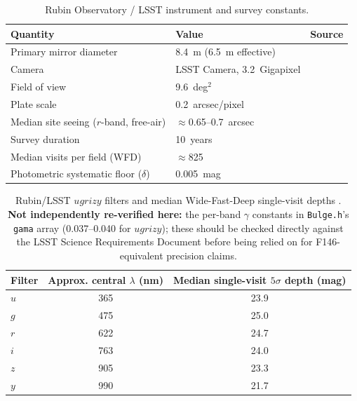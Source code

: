 \documentclass[english,10pt,a4paper]{article}
\begin{document}
	\begin{table}[htbp]
		\centering
		\begin{tabular}{lll}
			\toprule
			Quantity & Value & Source \\
			\midrule
			Primary mirror diameter & 8.4~m (6.5~m effective) & \cite{RubinAbout} \\
			Camera & LSST Camera, 3.2~Gigapixel & \cite{RubinAbout} \\
			Field of view & 9.6~deg$^2$ & \cite{Ivezic2019LSST} \\
			Plate scale & 0.2~arcsec/pixel & \cite{Ivezic2019LSST} \\
			Median site seeing ($r$-band, free-air) & $\approx$0.65--0.7~arcsec & \cite{Ivezic2019LSST} \\
			Survey duration & 10~years & \cite{Ivezic2019LSST} \\
			Median visits per field (WFD) & $\approx$825 & \cite{Ivezic2019LSST} \\
			Photometric systematic floor ($\delta$) & 0.005~mag & \cite{Ivezic2019LSST} \\
			\bottomrule
		\end{tabular}
		\caption{Rubin Observatory / LSST instrument and survey constants.}
		\label{tab:rubin_instrument}
	\end{table}
	
	\begin{table}[htbp]
		\centering
		\begin{tabular}{lcc}
			\toprule
			Filter & Approx. central $\lambda$ (nm) & Median single-visit $5\sigma$ depth (mag) \\
			\midrule
			$u$ & 365 & 23.9 \\
			$g$ & 475 & 25.0 \\
			$r$ & 622 & 24.7 \\
			$i$ & 763 & 24.0 \\
			$z$ & 905 & 23.3 \\
			$y$ & 990 & 21.7 \\
			\bottomrule
		\end{tabular}
		\caption{Rubin/LSST $ugrizy$ filters and median Wide-Fast-Deep single-visit depths \cite{Ivezic2019LSST}. \textbf{Not independently re-verified here:} the per-band $\gamma$ constants in \texttt{Bulge.h}'s \texttt{gama} array (0.037--0.040 for $ugrizy$); these should be checked directly against the LSST Science Requirements Document before being relied on for F146-equivalent precision claims.}
		\label{tab:rubin_filters}
	\end{table}
	
\end{document}
